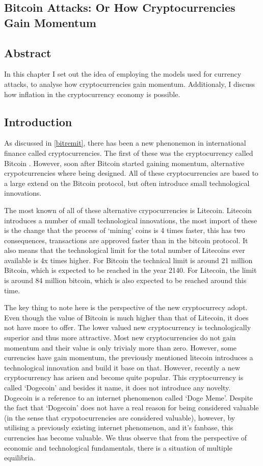 \begin{refsection}
\chapter{Bitcoin Attacks: Or How Cryptocurrencies Gain Momentum}
\label{bitatt}
\section*{Abstract}
In this chapter I set out the idea of employing the models used for currency attacks,
to analyse how cryptocurrencies gain momentum.
Additionaly, I discuss how inflation in the cryptocurrency economy is possible.
\pagebreak

\section{Introduction}
As discussed in \autoref{bitremit}, there has been a new phenonemon in international finance called cryptocurrencies.
The first of these was the cryptocurrency called Bitcoin \parencite{nakamoto2008bitcoin}.
However, soon after Bitcoin started gaining momentum, alternative crypotcurrencies where being designed.
All of these cryptocurrencies are based to a large extend on the Bitcoin protocol,
but often introduce small technological innovations.

The most known of all of these alternative crypocurrencies is Litecoin. Litecoin introduces a number of small technological innovations,
the most import of these is the change that the process of `mining' coins is 4 times faster,
this has two consequences, transactions are approved faster than in the bitcoin protocol.
It also means that the technological limit for the total number of Litecoins ever available is 4x times higher.
For Bitcoin the technical limit is around 21 million Bitcoin, which is expected to be reached in the year 2140.
For Litecoin, the limit is around 84 million bitcoin, which is also expected to be reached around this time.

The key thing to note here is the perspective of the new cryptocurrecy adopt.
Even though the value of Bitcoin is much higher than that of Litecoin, it does not have more to offer.
The lower valued new cryptocurrency is technologically superior and thus more attractive.
Most new cryptocurrencies do not gain momentum and their value is only trivialy more than zero.
However, some currencies have gain momentum,
the previously mentioned litecoin introduces a technological innovation and build it base on that.
However, recently a new cryptocurrency has arisen and become quite popular.
This cryptocurrency is called `Dogecoin' and besides it name, it does not introduce any novelty.
Dogecoin is a reference to an internet phenomenon called `Doge Meme'.
Despite the fact that `Dogecoin' does not have a real reason for being considered valuable
(in the sense that crypotocurrencies are considered valuable),
however, by utilising a previously existing internet phenomenon, and it's fanbase, this currencies has become valuable.
We thus observe that from the perspective of economic and technological fundamentals,
there is a situation of multiple equilibria.


\end{refsection}
